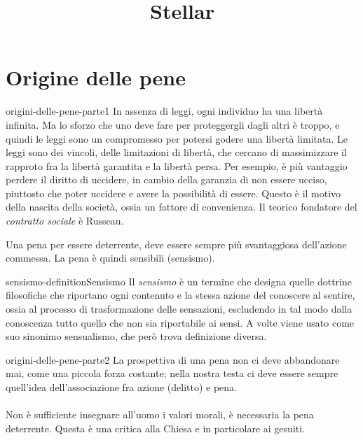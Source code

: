 \documentclass[preview]{standalone}
\begin{document}
\title{Stellar}
\genpage

\section{Origine delle pene}

\begin{snippet}{origini-delle-pene-parte1}
    In assenza di leggi, ogni individuo ha una libertà infinita. Ma lo sforzo che uno deve fare
    per proteggergli dagli altri è troppo, e quindi le leggi sono un compromesso per potersi godere una libertà
    limitata. Le leggi sono dei vincoli, delle limitazioni di libertà, che cercano di massimizzare
    il rapproto fra la libertà garantita e la libertà persa.
    Per esempio, è più vantaggio perdere il diritto di uccidere, in cambio della garanzia
    di non essere ucciso, piuttosto che poter uccidere e avere la possibilità di essere.
    Questo è il motivo della nascita della società, ossia un fattore di convenienza.
    Il teorico fondatore del \textit{contratto sociale} è Russeau.
    
    Una pena per essere deterrente, deve essere sempre più svantaggiosa dell'azione commessa.
    La pena è quindi sensibili (sensismo).
\end{snippet}

\begin{snippetdefinition}{sensismo-definition}{Sensismo}
    Il \textit{sensismo} è un termine che designa quelle
    dottrine filosofiche che riportano ogni contenuto e la stessa azione del
    conoscere al sentire, ossia al processo di trasformazione delle sensazioni,
    escludendo in tal modo dalla conoscenza tutto quello che non sia riportabile ai sensi.
    A volte viene usato come suo sinonimo sensualismo, che però trova definizione diversa.
\end{snippetdefinition}

\begin{snippet}{origini-delle-pene-parte2}
    La prospettiva di una pena non ci deve abbandonare mai, come una piccola forza costante;
    nella nostra testa ci deve essere sempre quell'idea dell'associazione fra azione (delitto) e pena.
    \\\\
    Non è sufficiente insegnare all'uomo i valori morali, è necessaria la pena deterrente.
    Questa è una critica alla Chiesa e in particolare ai gesuiti. 
\end{snippet}
\end{document}
